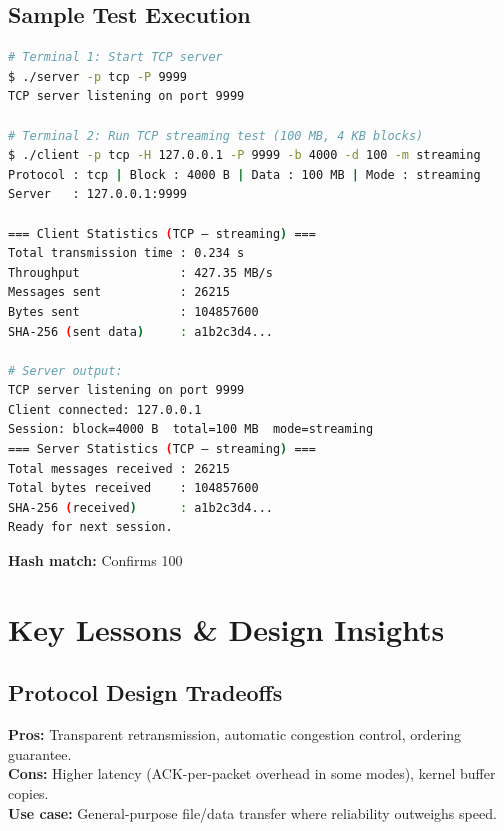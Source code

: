 \documentclass[12pt,a4paper]{article}
\begin{document}
\subsection{Sample Test Execution}

\begin{lstlisting}[caption=Running a Benchmark Test,language=bash,label=lst:benchmark]
# Terminal 1: Start TCP server
$ ./server -p tcp -P 9999
TCP server listening on port 9999

# Terminal 2: Run TCP streaming test (100 MB, 4 KB blocks)
$ ./client -p tcp -H 127.0.0.1 -P 9999 -b 4000 -d 100 -m streaming
Protocol : tcp | Block : 4000 B | Data : 100 MB | Mode : streaming
Server   : 127.0.0.1:9999

=== Client Statistics (TCP – streaming) ===
Total transmission time : 0.234 s
Throughput              : 427.35 MB/s
Messages sent           : 26215
Bytes sent              : 104857600
SHA-256 (sent data)     : a1b2c3d4...

# Server output:
TCP server listening on port 9999
Client connected: 127.0.0.1
Session: block=4000 B  total=100 MB  mode=streaming
=== Server Statistics (TCP – streaming) ===
Total messages received : 26215
Total bytes received    : 104857600
SHA-256 (received)      : a1b2c3d4...
Ready for next session.
\end{lstlisting}

\textbf{Hash match:} Confirms 100%

\section{Key Lessons \& Design Insights}
\label{sec:lessons}

\subsection{Protocol Design Tradeoffs}

\begin{tcolorbox}[colback=tcpblue!5,colframe=tcpblue,title=TCP: Simplicity and Reliability]
\textbf{Pros:} Transparent retransmission, automatic congestion control, ordering guarantee.\\
\textbf{Cons:} Higher latency (ACK-per-packet overhead in some modes), kernel buffer copies.\\
\textbf{Use case:} General-purpose file/data transfer where reliability outweighs speed.
\end{tcolorbox}
\end{document}
